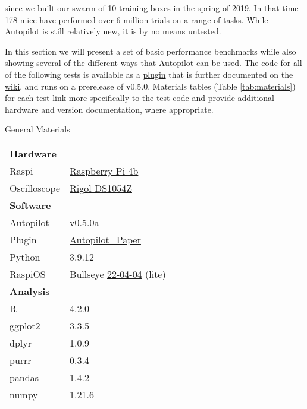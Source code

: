 
 since we built our swarm of 10 training boxes in the spring of 2019. In that time 178 mice have performed over 6 million trials on a range of tasks. While Autopilot is still relatively new, it is by no means untested.

In this section we will present a set of basic performance benchmarks while also showing several of the different ways that Autopilot can be used. The code for all of the following tests is available as a \href{https://github.com/auto-pi-lot/plugin-paper}{plugin} that is further documented on the \href{https://wiki.auto-pi-lot.com/index.php/Plugin:Autopilot_Paper}{wiki}, and runs on a prerelease of v0.5.0. Materials tables (Table \ref{tab:materials}) for each test link more specifically to the test code and provide additional hardware and version documentation, where appropriate.

\begin{margintable}[-0.5cm]
\caption{General Materials}
\label{tab:materials}
\noindent\begin{tabularx}{\linewidth}{lX}%
\toprule
\textbf{Hardware} & \\
Raspi & \href{https://www.raspberrypi.org/products/raspberry-pi-4-model-b/}{Raspberry Pi 4b}\\
Oscilloscope & \href{https://wiki.auto-pi-lot.com/index.php/Rigol\_DS1054Z}{Rigol DS1054Z} \\
\midrule
\textbf{Software} & \\
Autopilot & \href{https://github.com/auto-pi-lot/autopilot/tree/v0.5.0a}{v0.5.0a} \\
Plugin & \href{https://wiki.auto-pi-lot.com/index.php/Plugin:Autopilot\_Paper}{Autopilot\_Paper} \\
Python & 3.9.12 \\
RaspiOS & Bullseye \href{https://downloads.raspberrypi.org/raspios_lite_armhf/images/raspios\_lite\_armhf-2022-04-07/}{22-04-04} (lite) \\
\midrule
\textbf{Analysis} & \\
R & 4.2.0 \\
ggplot2\citep{wickhamGgplot2ElegantGraphics2016a} & 3.3.5 \\
dplyr\citep{wickhamDplyrGrammarData2022} & 1.0.9 \\
purrr\citep{henryPurrrFunctionalProgramming2020} & 0.3.4 \\
pandas\citep{mckinneyPandasFoundationalPython2011} & 1.4.2 \\
numpy\citep{waltNumPyArrayStructure2011,harrisArrayProgrammingNumPy2020a} & 1.21.6 \\ 
\bottomrule
\end{tabularx}
\end{margintable}
